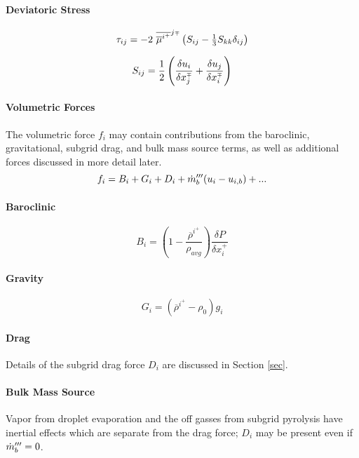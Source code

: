 \documentclass[11pt]{article}
\begin{document}
\paragraph{Deviatoric Stress}

\begin{equation}
\label{eqn_deviatoric_stress}
\tau_{ij} = -2 \,\,\overline{\overline{\mu}^{i^+}}^{j{\scriptscriptstyle \mp}} \left( S_{ij} - \mbox{$\frac{1}{3}$} S_{kk} \delta_{ij} \right)
\end{equation}

\begin{equation}
\label{eqn_strain_tensor}
S_{ij} = \frac{1}{2}\left( \frac{\delta u_i}{\delta x_j^{\scriptscriptstyle \mp}} + \frac{\delta u_j}{\delta x_i^{\scriptscriptstyle \mp}} \right)
\end{equation}

\paragraph{Volumetric Forces} The volumetric force $f_i$ may contain contributions from the baroclinic, gravitational, subgrid drag, and bulk mass source terms, as well as additional forces discussed in more detail later.
\begin{equation}
f_i = B_i + G_i + D_i + \dot{m}_b^{\prime\prime\prime}(u_i - u_{i,b}) + ...
\end{equation}

\paragraph{Baroclinic}
\begin{equation}
B_i = \left(1-\frac{\overline{\rho}^{i^+}}{\rho_{avg}}\right) \frac{\delta P}{\delta x_i^+}
\end{equation}

\paragraph{Gravity}
\begin{equation}
G_i = (\overline{\rho}^{i^+}-\rho_0)g_i
\end{equation}

\paragraph{Drag} Details of the subgrid drag force $D_i$ are discussed in Section \ref{sec}.

\paragraph{Bulk Mass Source} Vapor from droplet evaporation and the off gasses from subgrid pyrolysis have inertial effects which are separate from the drag force; $D_i$ may be present even if $\dot{m}_b^{\prime\prime\prime}=0$.
\end{document}
